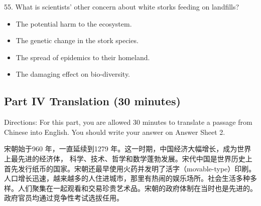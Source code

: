 \documentclass[UTF8,11pt]{ctexart}
\begin{document}
55. What is scientists’ other concern about white storks feeding on landfills?


\begin{itemize}[leftmargin=2em,itemsep=.2em,topsep=.4em]\item[A.] The potential harm to the ecosystem.
\item[B.] The genetic change in the stork species.
\item[C.] The spread of epidemics to their homeland.
\item[D.] The damaging effect on bio-diversity.
\end{itemize}

\subsection*{\textbf{Part IV Translation (30 minutes)}}


Directions: For this part, you are allowed 30 minutes to translate a passage from Chinese into English. You should write your answer on Answer Sheet 2.


宋朝始于960 年，一直延续到1279 年。这一时期，中国经济大幅增长，成为世界上最先进的经济体， 科学、技术、哲学和数学蓬勃发展。宋代中国是世界历史上首先发行纸币的国家。宋朝还最早使用火药并发明了活字（movable-type）印刷。人口增长迅速，越来越多的人住进城市，那里有热闹的娱乐场所。社会生活多种多样。人们聚集在一起观看和交易珍贵艺术品。宋朝的政府体制在当时也是先进的。政府官员均通过竞争性考试选拔任用。
\end{document}
